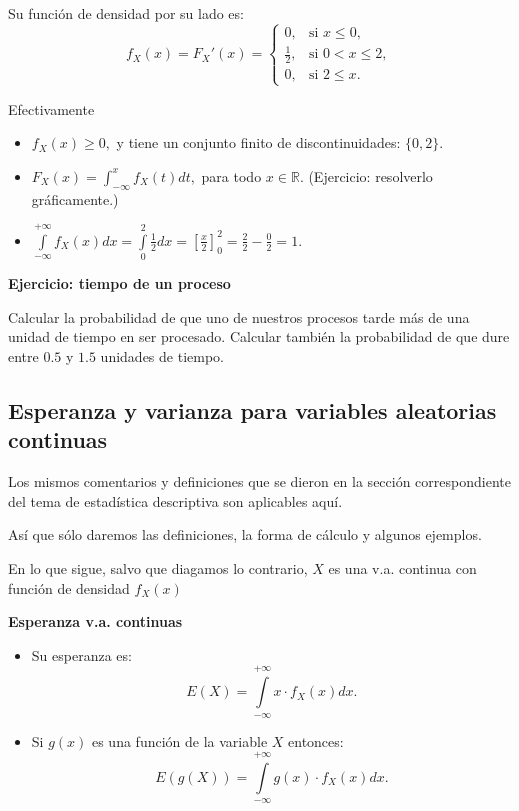 \documentclass[]{book}
\providecommand{\tightlist}{%
  \setlength{\itemsep}{0pt}\setlength{\parskip}{0pt}}
\begin{document}
Su función de densidad por su lado es:
\[
f_{X}(x)=F_{X}'(x)=\left\{\begin{array}{ll}
0, & \mbox{si } x\leq 0,\\[1ex]
\frac12, & \mbox{si } 0<x\leq 2,\\[1ex]
0, & \mbox{si } 2\leq x.
\end{array}\right.
\]

Efectivamente

\begin{itemize}
\item
  \(f_{X}(x)\geq 0,\) y tiene un conjunto finito de discontinuidades: \(\{0,2\}\).
\item
  \(F_X(x)=\int_{-\infty}^x f_X(t) dt,\) para todo \(x\in \mathbb{R}\). (Ejercicio: resolverlo gráficamente.)
\item
  \(\displaystyle\int\limits_{-\infty}^{+\infty}f_{X}(x)dx= \int\limits_0^2\frac12dx=\left[\frac{x}2\right]_0^2=\frac22-\frac02=1.\)
\end{itemize}

\textbf{Ejercicio: tiempo de un proceso}

Calcular la probabilidad de que uno de nuestros procesos tarde
más de una unidad de tiempo en ser procesado. Calcular también la probabilidad de
que dure entre \(0.5\) y \(1.5\) unidades de tiempo.

\hypertarget{esperanza-y-varianza-para-variables-aleatorias-continuas}{%
\subsection{Esperanza y varianza para variables aleatorias continuas}\label{esperanza-y-varianza-para-variables-aleatorias-continuas}}

Los mismos comentarios y definiciones que se dieron en la sección correspondiente del tema
de estadística descriptiva son aplicables aquí.

Así que sólo daremos las definiciones, la forma de cálculo y algunos ejemplos.

En lo que sigue, salvo que diagamos lo contrario, \(X\) es una v.a. continua con función de densidad \(f_{X}(x)\)

\textbf{Esperanza v.a. continuas}

\begin{itemize}
\tightlist
\item
  Su esperanza es:
  \[E(X)=\displaystyle\int\limits_{-\infty}^{+\infty} x\cdot f_{X}(x)dx.\]
\item
  Si \(g(x)\) es una función de la variable \(X\) entonces:
  \[E(g(X))=\displaystyle\int\limits_{-\infty}^{+\infty} g(x)\cdot f_{X}(x)dx.\]
\end{itemize}
\end{document}
